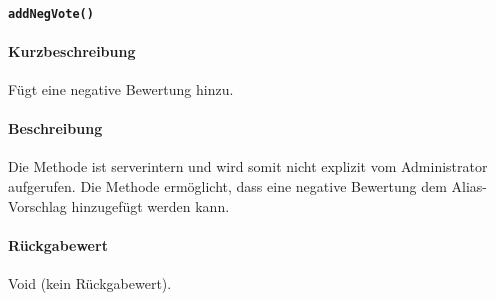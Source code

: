 \paragraph*{\texttt{addNegVote()}}%
\paragraph*{Kurzbeschreibung}
Fügt eine negative Bewertung hinzu.
\paragraph*{Beschreibung}
Die Methode ist serverintern und wird somit nicht explizit vom Administrator aufgerufen.
Die Methode ermöglicht, dass eine negative Bewertung dem Alias-Vorschlag hinzugefügt werden kann.
\paragraph*{Rückgabewert}
Void (kein Rückgabewert).

